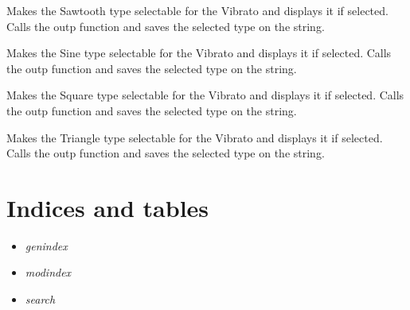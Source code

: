 \documentclass[letterpaper,10pt,english]{sphinxmanual}
\begin{document}

\begin{fulllineitems}
\label{Code:GUI.vibratoSAWTOOTH_val}
Makes the Sawtooth type selectable for the Vibrato and displays it if selected. Calls the outp function and saves the selected 
type on the string.

\end{fulllineitems}


\begin{fulllineitems}
\label{Code:GUI.vibratoSINE_val}
Makes the Sine type selectable for the Vibrato and displays it if selected. Calls the outp function and saves the selected 
type on the string.

\end{fulllineitems}


\begin{fulllineitems}
\label{Code:GUI.vibratoSQUARE_val}
Makes the Square type selectable for the Vibrato and displays it if selected. Calls the outp function and saves the selected 
type on the string.

\end{fulllineitems}


\begin{fulllineitems}
\label{Code:GUI.vibratoTRIANGLE_val}
Makes the Triangle type selectable for the Vibrato and displays it if selected. Calls the outp function and saves the selected 
type on the string.

\end{fulllineitems}



\chapter{Indices and tables}
\label{index:indices-and-tables}\begin{itemize}
\item {} 
\emph{genindex}

\item {} 
\emph{modindex}

\item {} 
\emph{search}

\end{itemize}
\end{document}
